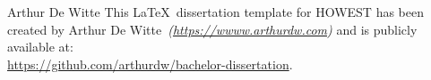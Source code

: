 \documentclass[12pt,twoside]{report}
\begin{document}

\todototoc
\listoftodos


\emptypage


\thispagestyle{plain}
\emptypage


\thispagestyle{plain}
\emptypage

\tableofcontents
\thispagestyle{plain}
\emptypage

\newpage
{}
\pagestyle{howest-section}





\printglossary[type=\acronymtype]
\printglossary



\def \templateauthor{Arthur De Witte} %
\ifx\thesisauthor\templateauthor
\else
    \normalsize
    This \LaTeX\ dissertation template for HOWEST has been created by \templateauthor\ \textit{(\url{https://wwww.arthurdw.com})} and is publicly available at: \\ \url{https://github.com/arthurdw/bachelor-dissertation}. \\
    \small
\fi
\printbibliography[heading=bib]

\appendix

\end{document}
